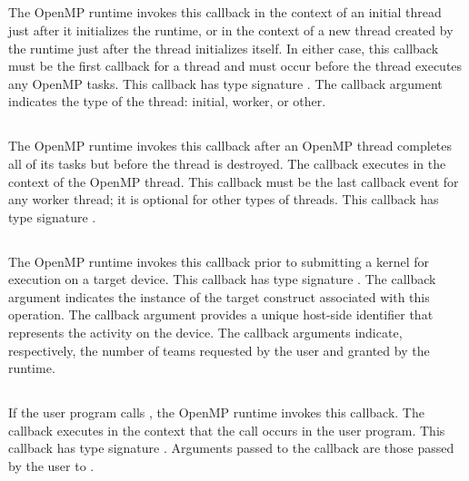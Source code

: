 \subsection{}
The OpenMP runtime invokes this callback in the context of an initial thread just after it initializes the runtime, or in the context of a new thread created by the runtime just after the thread initializes itself. In either case, this callback must be the first callback for a thread
and must occur before the thread executes any OpenMP tasks. This callback has type signature .
The callback argument  indicates the type of the thread: initial, worker, or other.

\subsection{}
The OpenMP runtime invokes this callback
after an OpenMP thread completes all of
its tasks but before the thread is destroyed. The callback
executes in the context of the OpenMP thread. This callback must be the last callback event for any worker thread; it is optional for other types of threads.
This callback has type signature .

\subsection{}

The OpenMP runtime invokes this callback prior to submitting a kernel for execution on a target device.
This callback has type signature .
The callback argument  indicates the instance of the target construct associated with this operation.
The callback argument  provides a unique host-side identifier that represents the activity on the device.
The callback arguments    indicate, respectively, the number of teams requested by the user and granted by the runtime.

\subsection{}
\label{subsec:ompt_event_control}
If the user program calls , the
OpenMP runtime invokes this callback.
The callback executes in the context that the call occurs in the user program.
This callback has type signature .
Arguments passed to the callback are those passed by the user to .

